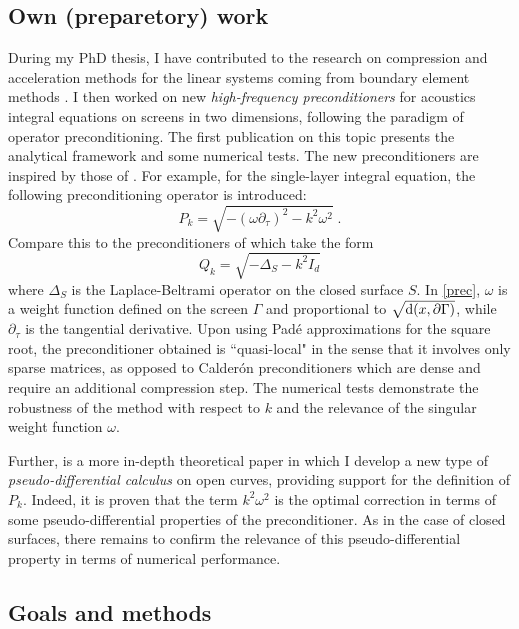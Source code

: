 \documentclass[]{report}
\begin{document}
\subsection{Own (preparetory) work}

During my PhD thesis, I have contributed to the research on compression and acceleration
methods for the linear systems coming from boundary element methods
\cite{averseng2017fast}. I then worked on new \emph{high-frequency preconditioners} for acoustics
integral equations on screens in two dimensions, following the paradigm of operator
preconditioning. The first publication on this topic \cite{alouges2019new} presents the
analytical framework and some numerical tests. The new preconditioners are inspired by those of
\cite{antoine2007generalized}. For example, for the single-layer integral equation, the
following preconditioning operator is introduced:
\begin{equation}
\label{prec}
P_k = \sqrt{-(\omega \partial_\tau)^2 - k^2 \omega^2}\;.
\end{equation}
Compare this to the preconditioners of \cite{antoine2007generalized} which take the
form \[Q_k = \sqrt{-\Delta_S - k^2 I_d}\] where $\Delta_S$ is the Laplace-Beltrami
operator on the closed surface $S$.  In \eqref{prec}, $\omega$ is a weight function
defined on the screen $\Gamma$ and proportional to $\sqrt{\textup{d}(x,\partial \Gamma)}$,
while $\partial_\tau$ is the tangential derivative.  Upon using Padé approximations for
the square root, the preconditioner obtained is ``quasi-local" in the sense that it
involves only sparse matrices, as opposed to Calder\'{o}n preconditioners which are dense
and require an additional compression step. The numerical tests demonstrate the robustness
of the method with respect to $k$ and the relevance of the singular weight function
$\omega$.

Further, \cite{averseng2019pseudo} is a more in-depth theoretical paper in which I develop
a new type of \emph{pseudo-differential calculus} on open curves, providing support for the
definition of $P_k$. Indeed, it is proven that the term $k^2 \omega^2$ is the optimal
correction in terms of some pseudo-differential properties of the preconditioner. As in
the case of closed surfaces, there remains to confirm the relevance of this
pseudo-differential property in terms of numerical performance.



\subsection{Goals and methods}
\end{document}
